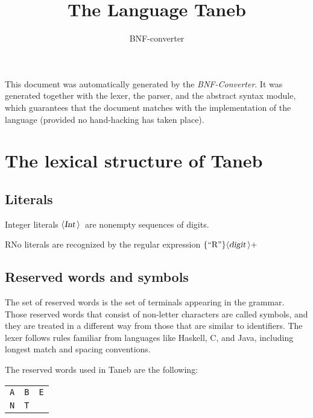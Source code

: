 \documentclass[a4paper,11pt]{article}
\author{BNF-converter}
\title{The Language Taneb}
\begin{document}
\maketitle

\newcommand{\emptyP}{\mbox{$\epsilon$}}
\newcommand{\terminal}[1]{\mbox{{\texttt {#1}}}}
\newcommand{\nonterminal}[1]{\mbox{$\langle \mbox{{\sl #1 }} \! \rangle$}}
\newcommand{\arrow}{\mbox{::=}}
\newcommand{\delimit}{\mbox{$|$}}
\newcommand{\reserved}[1]{\mbox{{\texttt {#1}}}}
\newcommand{\literal}[1]{\mbox{{\texttt {#1}}}}
\newcommand{\symb}[1]{\mbox{{\texttt {#1}}}}

This document was automatically generated by the {\em BNF-Converter}. It was generated together with the lexer, the parser, and the abstract syntax module, which guarantees that the document matches with the implementation of the language (provided no hand-hacking has taken place).

\section*{The lexical structure of Taneb}

\subsection*{Literals}
Integer literals \nonterminal{Int}\ are nonempty sequences of digits.




RNo literals are recognized by the regular expression
\(\{\mbox{``R''}\} {\nonterminal{digit}}+\)


\subsection*{Reserved words and symbols}
The set of reserved words is the set of terminals appearing in the grammar. Those reserved words that consist of non-letter characters are called symbols, and they are treated in a different way from those that are similar to identifiers. The lexer follows rules familiar from languages like Haskell, C, and Java, including longest match and spacing conventions.

The reserved words used in Taneb are the following: \\

\begin{tabular}{lll}
{\reserved{A}} &{\reserved{B}} &{\reserved{E}} \\
{\reserved{N}} &{\reserved{T}} & \\
\end{tabular}\\
\end{document}
